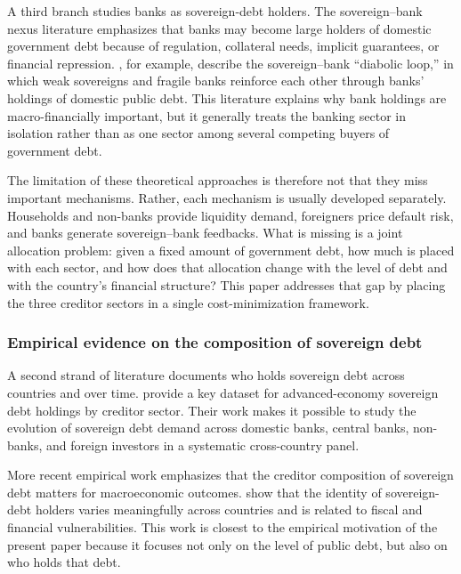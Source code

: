 \documentclass[\latexroot/\projectname]{subfiles}
\begin{document}
A third branch studies banks as sovereign-debt holders.
The sovereign--bank nexus literature emphasizes that banks may become large holders of domestic government debt because of regulation, collateral needs, implicit guarantees, or financial repression.
\citet{BrunnermeierEtAl2016}, for example, describe the sovereign--bank ``diabolic loop,'' in which weak sovereigns and fragile banks reinforce each other through banks' holdings of domestic public debt.
This literature explains why bank holdings are macro-financially important, but it generally treats the banking sector in isolation rather than as one sector among several competing buyers of government debt.

The limitation of these theoretical approaches is therefore not that they miss important mechanisms.
Rather, each mechanism is usually developed separately.
Households and non-banks provide liquidity demand, foreigners price default risk, and banks generate sovereign--bank feedbacks.
What is missing is a joint allocation problem: given a fixed amount of government debt, how much is placed with each sector, and how does that allocation change with the level of debt and with the country's financial structure?
This paper addresses that gap by placing the three creditor sectors in a single cost-minimization framework.

\subsubsection{Empirical evidence on the composition of sovereign debt}
\whenintegrated{\label{lit-empirical-composition}}

A second strand of literature documents who holds sovereign debt across countries and over time.
\citet{ArslanalpTsuda2014} provide a key dataset for advanced-economy sovereign debt holdings by creditor sector.
Their work makes it possible to study the evolution of sovereign debt demand across domestic banks, central banks, non-banks, and foreign investors in a systematic cross-country panel.

More recent empirical work emphasizes that the creditor composition of sovereign debt matters for macroeconomic outcomes.
\citet{FangHardyLewis2023} show that the identity of sovereign-debt holders varies meaningfully across countries and is related to fiscal and financial vulnerabilities.
This work is closest to the empirical motivation of the present paper because it focuses not only on the level of public debt, but also on who holds that debt.
\end{document}
